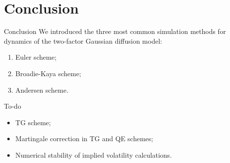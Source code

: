 \documentclass{vegapresentation}
\begin{document}
    \section{Conclusion}
        \begin{frame}{Conclusion}
            We introduced the three most common simulation methods for dynamics of the two-factor Gaussian diffusion model:
            \begin{enumerate}
                \item Euler scheme; 
                \item Broadie-Kaya scheme;
                \item Andersen scheme.
            \end{enumerate}
        \end{frame}
        \begin{frame}{To-do}
            \begin{itemize}
                \item TG scheme;
                \item Martingale correction in TG and QE schemes;
                \item Numerical stability of implied volatility calculations.
            \end{itemize}
        \end{frame}
\end{document}
